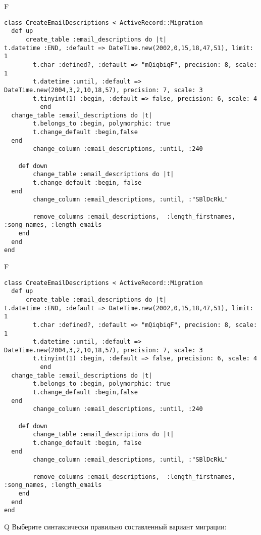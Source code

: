 F
\begin{verbatim}
class CreateEmailDescriptions < ActiveRecord::Migration
  def up
	  create_table :email_descriptions do |t|
t.datetime :END, :default => DateTime.new(2002,0,15,18,47,51), limit: 1
		t.char :defined?, :default => "mQiqbiqF", precision: 8, scale: 1
		t.datetime :until, :default => DateTime.new(2004,3,2,10,18,57), precision: 7, scale: 3
		t.tinyint(1) :begin, :default => false, precision: 6, scale: 4
		  end
  change_table :email_descriptions do |t|
		t.belongs_to :begin, polymorphic: true
 		t.change_default :begin,false
  end
 		change_column :email_descriptions, :until, :240
   
	def down
		change_table :email_descriptions do |t|
		t.change_default :begin, false
  end
 		change_column :email_descriptions, :until, :"SBlDcRkL"
   
		remove_columns :email_descriptions,  :length_firstnames, :song_names, :length_emails 
    end 
  end
end

\end{verbatim}

F
\begin{verbatim}
class CreateEmailDescriptions < ActiveRecord::Migration
  def up
	  create_table :email_descriptions do |t|
t.datetime :END, :default => DateTime.new(2002,0,15,18,47,51), limit: 1
		t.char :defined?, :default => "mQiqbiqF", precision: 8, scale: 1
		t.datetime :until, :default => DateTime.new(2004,3,2,10,18,57), precision: 7, scale: 3
		t.tinyint(1) :begin, :default => false, precision: 6, scale: 4
		  end
  change_table :email_descriptions do |t|
		t.belongs_to :begin, polymorphic: true
 		t.change_default :begin,false
  end
 		change_column :email_descriptions, :until, :240
   
	def down
		change_table :email_descriptions do |t|
		t.change_default :begin, false
  end
 		change_column :email_descriptions, :until, :"SBlDcRkL"
   
		remove_columns :email_descriptions,  :length_firstnames, :song_names, :length_emails 
    end 
  end
end

\end{verbatim}

Q
Выберите синтаксически правильно составленный вариант миграции:

